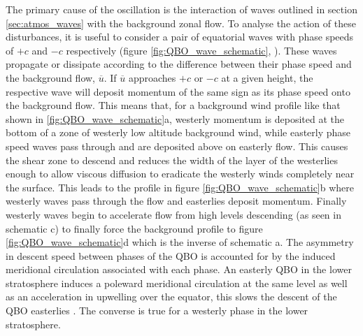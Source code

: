 The primary cause of the oscillation is the interaction of waves outlined in section \ref{sec:atmos_waves} with the background zonal flow. To analyse the action of these disturbances, it is useful to consider a pair of equatorial waves with phase speeds of $+c$ and $-c$ respectively (figure \ref{fig:QBO_wave_schematic}, \cite{plumbQuasibiennial1984}). These waves propagate or dissipate according to the difference between their phase speed and the background flow, $\overbar{u}$. If $\overbar{u}$ approaches $+c$ or $-c$ at a given height, the respective wave will deposit momentum of the same sign as its phase speed onto the background flow. This means that, for a background wind profile like that shown in \ref{fig:QBO_wave_schematic}a, westerly momentum is deposited at the bottom of a zone of westerly low altitude background wind, while easterly phase speed waves pass through and are deposited above on easterly flow. This causes the shear zone to descend and reduces the width of the layer of the westerlies enough to allow viscous diffusion to eradicate the westerly winds completely near the surface. This leads to the profile in figure \ref{fig:QBO_wave_schematic}b where westerly waves pass through the flow and easterlies deposit momentum. Finally westerly waves begin to accelerate flow from high levels descending (as seen in schematic c) to finally force the background profile to figure \ref{fig:QBO_wave_schematic}d which is the inverse of schematic a. The asymmetry in descent speed between phases of the QBO is accounted for by the induced meridional circulation associated with each phase. An easterly QBO in the lower stratosphere induces a poleward meridional circulation at the same level \citep{plumbQuasibiennial1984, baldwinQuasiBiennial2001} as well as an acceleration in upwelling over the equator, this slows the descent of the QBO easterlies \citep{reedQuasiBiennial1965}. The converse is true for a westerly phase in the lower stratosphere.

